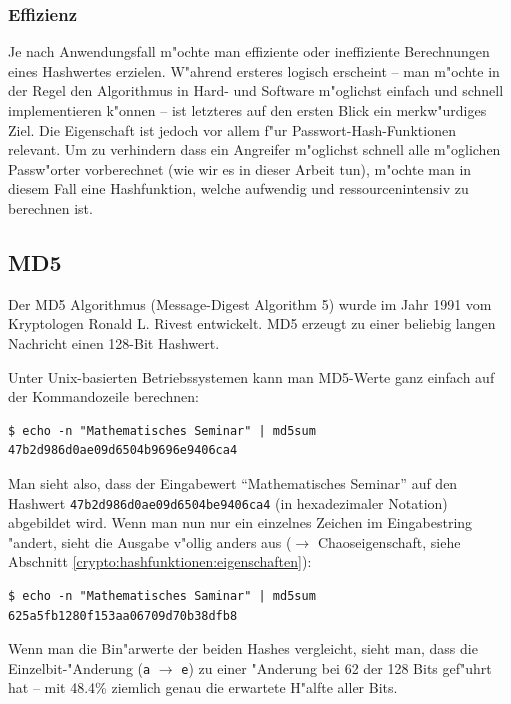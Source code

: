 \begin{refsection}
\subsubsection{Effizienz}

Je nach Anwendungsfall m"ochte man effiziente oder ineffiziente Berechnungen
eines Hashwertes erzielen. W"ahrend ersteres logisch erscheint -- man m"ochte in
der Regel den Algorithmus in Hard- und Software m"oglichst einfach und schnell
implementieren k"onnen -- ist letzteres auf den ersten Blick ein merkw"urdiges
Ziel. Die Eigenschaft ist jedoch vor allem f"ur Passwort-Hash-Funktionen
relevant. Um zu verhindern dass ein Angreifer m"oglichst schnell alle m"oglichen
Passw"orter vorberechnet (wie wir es in dieser Arbeit tun), m"ochte man in
diesem Fall eine Hashfunktion, welche aufwendig und ressourcenintensiv zu
berechnen ist.

\subsection{MD5}

Der MD5 Algorithmus (Message-Digest Algorithm 5) wurde im Jahr 1991 vom
Kryptologen Ronald L. Rivest entwickelt. MD5 erzeugt zu einer beliebig langen
Nachricht einen 128-Bit Hashwert.

Unter Unix-basierten Betriebssystemen kann man MD5-Werte ganz einfach auf der
Kommandozeile berechnen:

\begin{verbatim}
$ echo -n "Mathematisches Seminar" | md5sum 
47b2d986d0ae09d6504b9696e9406ca4
\end{verbatim}

Man sieht also, dass der Eingabewert ``Mathematisches Seminar'' auf den Hashwert
\texttt{47b2\-d986\-d0ae\-09d6\-504b\-e940\-6ca4} (in hexadezimaler
Notation) abgebildet wird. Wenn man nun nur ein einzelnes Zeichen im
Eingabestring "andert, sieht die Ausgabe v"ollig anders aus ($\rightarrow$
Chaoseigenschaft, siehe Abschnitt \ref{crypto:hashfunktionen:eigenschaften}):

\begin{verbatim}
$ echo -n "Mathematisches Saminar" | md5sum 
625a5fb1280f153aa06709d70b38dfb8
\end{verbatim}

Wenn man die Bin"arwerte der beiden Hashes vergleicht, sieht man, dass die
Einzelbit-"Anderung (\texttt{a} $\rightarrow$ \texttt{e}) zu einer "Anderung bei
62 der 128 Bits gef"uhrt hat -- mit 48.4\% ziemlich genau die erwartete H"alfte
aller Bits.


\end{refsection}
